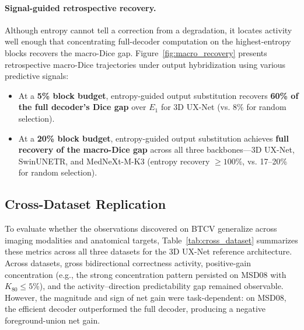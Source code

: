 \paragraph{Signal-guided retrospective recovery.} Although entropy cannot tell a correction from a degradation, it locates activity well enough that concentrating full-decoder computation on the highest-entropy blocks recovers the macro-Dice gap. Figure~\ref{fig:macro_recovery} presents retrospective macro-Dice trajectories under output hybridization using various predictive signals:
\begin{itemize}
    \item At a \textbf{5\% block budget}, entropy-guided output substitution recovers \textbf{60\% of the full decoder's Dice gap} over $E_1$ for 3D UX-Net (vs. 8\% for random selection).
    \item At a \textbf{20\% block budget}, entropy-guided output substitution achieves \textbf{full recovery of the macro-Dice gap} across all three backbones---3D UX-Net, SwinUNETR, and MedNeXt-M-K3 (entropy recovery $\ge 100\%$, vs. 17--20\% for random selection).
\end{itemize}



\subsection{Cross-Dataset Replication}
\label{sec:results_cross_dataset}

To evaluate whether the observations discovered on BTCV generalize across imaging modalities and anatomical targets, Table~\ref{tab:cross_dataset} summarizes these metrics across all three datasets for the 3D UX-Net reference architecture.
Across datasets, gross bidirectional correctness activity, positive-gain concentration (e.g., the strong concentration pattern persisted on MSD08 with $K_{80} \le 5\%$), and the activity--direction predictability gap remained observable. However, the magnitude and sign of net gain were task-dependent: on MSD08, the efficient decoder outperformed the full decoder, producing a negative foreground-union net gain.

